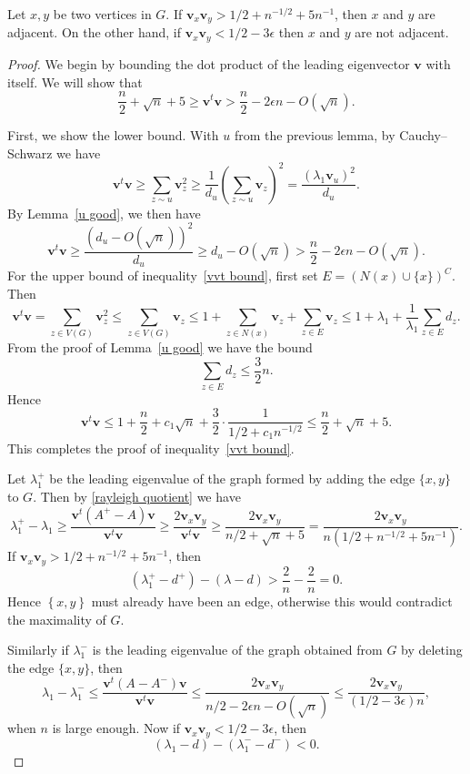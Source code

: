 \begin{lemma}\label{modifying conditions}
 Let $x,y$ be two vertices in $G$.  If
 $\mathbf{v}_x\mathbf{v}_y > 1/2 +n^{-1/2} + 5n^{-1}$, then $x$ and $y$ are adjacent.  On the
 other hand, if $\mathbf{v}_x\mathbf{v}_y < 1/2 - 3\epsilon$ then $x$ and $y$ are not adjacent.
\end{lemma}
\begin{proof}
We begin by bounding the dot product of the leading eigenvector $\textbf{v}$
with itself.  We will show that
\begin{equation}\label{vvt bound}
\frac{n}{2} + \sqrt{n} + 5 \geq \textbf{v}^t\textbf{v} > \frac{n}{2} - 2 \epsilon n  - O(\sqrt{n}).
\end{equation}


\noindent First, we show the lower bound.  With $u$ from the previous lemma, by Cauchy--Schwarz we have
\[  \textbf{v}^t\textbf{v} \geq \sum_{z \sim u} \mathbf{v}_z^2 \geq \frac{1}{d_u}\left( \sum_{z \sim u} \mathbf{v}_z \right)^2 = \frac{(\lambda_1 \mathbf{v}_u)^2}{d_u}. \]
By Lemma~\ref{u good}, we then have
 \[\textbf{v}^t\textbf{v} \geq \frac{(d_u - O(\sqrt{n}))^2}{d_u} \geq d_u - O(\sqrt{n}) > \frac{n}{2} - 2 \epsilon n  - O(\sqrt{n}) .\]
For the upper bound of inequality~\eqref{vvt bound}, first set $E = \left( N(x) \cup \{x\}\right)^C$.  Then
 \[ \textbf{v}^t\textbf{v} = \sum_{z \in V(G)} \mathbf{v}_z^2 \leq \sum_{z \in V(G)} \mathbf{v}_z \leq 1 + \sum_{z \in N(x)} \mathbf{v}_z + \sum_{z \in E} \mathbf{v}_z \leq 1 + \lambda_1 + \frac{1}{\lambda_1} \sum_{z \in E} d_z .\]
From the proof of Lemma~\ref{u good} we have the bound
 \[ \sum_{ z \in E} d_z \leq \frac{3}{2} n .\]
Hence
 \[ \textbf{v}^t \textbf{v}  \leq 1 + \frac{n}{2} + c_1 \sqrt{n} + \frac{3}{2} \cdot \frac{1}{1/2 + c_1 n^{-1/2}} \leq \frac{n}{2} + \sqrt{n} + 5 .\]
This completes the proof of inequality~\eqref{vvt bound}.


 Let $\lambda_1^+$ be the leading eigenvalue of the graph formed by adding the 
 edge $\{x,y\}$ to $G$.  Then by \eqref{rayleigh quotient} we have
  \[ \lambda_1^+ - \lambda_1 \geq \frac{\textbf{v}^t (A^+-A) \textbf{v}}{\textbf{v}^t \textbf{v}} \geq \frac{2\mathbf{v}_x\mathbf{v}_y}{\textbf{v}^t \textbf{v}} \geq \frac{2\mathbf{v}_x\mathbf{v}_y}{n/2 + \sqrt{n} + 5}  = \frac{2\mathbf{v}_x\mathbf{v}_y}{n(1/2+n^{-1/2} + 5 n^{-1})}.\]
If $\mathbf{v}_x\mathbf{v}_y > 1/2+n^{-1/2} + 5n^{-1}$, then
\[ (\lambda_1^+ - d^+) - (\lambda - d) > \frac{2}{n} - \frac{2}{n} = 0.\]
Hence $\left\{x,y\right\}$ must already have been an edge, otherwise this
would contradict the maximality of $G$.

Similarly if $\lambda_1^-$ is the leading eigenvalue of the graph obtained
from $G$ by deleting the edge $\{x,y\}$, then  
  \[ \lambda_1 - \lambda_1^- \leq \frac{\textbf{v}^t (A-A^-) \textbf{v}}{\textbf{v}^t \textbf{v}} \leq \frac{2\mathbf{v}_x\mathbf{v}_y}{n/2 - 2\epsilon n - O(\sqrt{n})} \leq \frac{2\mathbf{v}_x\mathbf{v}_y}{(1/2 - 3 \epsilon)n},\]
when $n$ is large enough.  Now if
$\mathbf{v}_x\mathbf{v}_y < 1/2 - 3\epsilon$, then 
 \[ (\lambda_1 - d) - (\lambda_1^- - d^-) < 0 .\] %

\end{proof}

